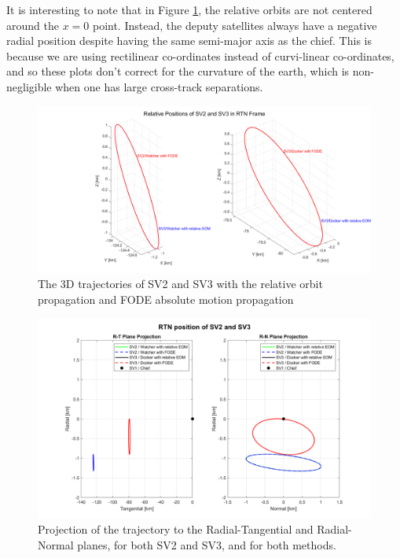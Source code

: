 It is interesting to note that in Figure \ref{fig:rel_3d_traj}, the relative orbits are not centered around the $x = 0$ point. Instead, the deputy satellites always have a negative radial position despite having the same semi-major axis as the chief. This is because we are using rectilinear co-ordinates instead of curvi-linear co-ordinates, and so these plots don't correct for the curvature of the earth, which is non-negligible when one has large cross-track separations.

\begin{figure}[H]
    \centering
    \includegraphics[width=0.9\linewidth]{sim/figures/SV2_SV3_3d_traj_rel.png}
    \caption{The 3D trajectories of SV2 and SV3 with the relative orbit propagation and FODE absolute motion propagation}
    \label{fig:rel_3d_traj}
\end{figure}

\begin{figure}[H]
    \centering
    \includegraphics[width=0.9\linewidth]{sim/figures/RTN_projection.png}
    \caption{Projection of the trajectory to the Radial-Tangential and Radial-Normal planes, for both SV2 and SV3, and for both methods.}
    \label{fig:rel_3d_proj}
\end{figure}

